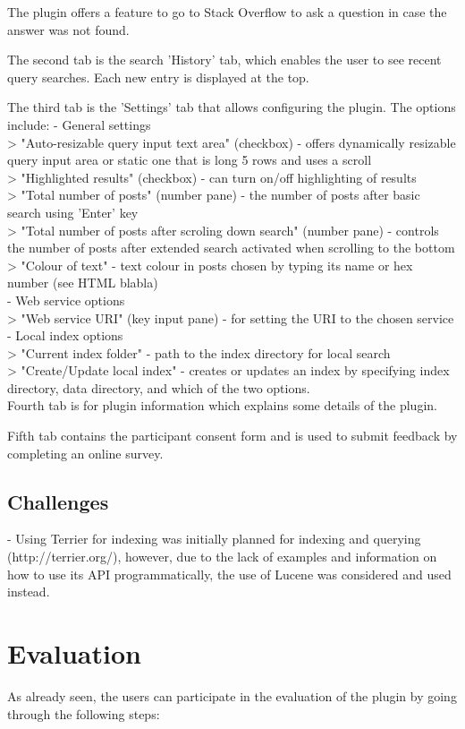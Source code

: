 \documentclass{l4proj}
\begin{document}
The plugin offers a feature to go to Stack Overflow to ask a question in case the answer was not found.

The second tab is the search 'History' tab, which enables the user to see recent query searches. Each new entry is displayed at the top.

The third tab is the 'Settings' tab that allows configuring the plugin. The options include:
- General settings\\
> "Auto-resizable query input text area" (checkbox) - offers dynamically resizable query input area or static one that is long 5 rows and uses a scroll\\
> "Highlighted results" (checkbox) - can turn on/off highlighting of results\\
> "Total number of posts" (number pane) - the number of posts after basic search using 'Enter' key \\
> "Total number of posts after scroling down search" (number pane) - controls the number of posts after extended search activated when scrolling to the bottom\\
> "Colour of text" - text colour in posts chosen by typing its name or hex number (see HTML blabla)\\
- Web service options\\
> "Web service URI" (key input pane) - for setting the URI to the chosen service\\
- Local index options\\
> "Current index folder" - path to the index directory for local search\\
> "Create/Update local index" - creates or updates an index by specifying index directory, data directory, and which of the two options.\\

Fourth tab is for plugin information which explains some details of the plugin.

Fifth tab contains the participant consent form and is used to submit feedback by completing an online survey.

\section{Challenges}
- Using Terrier for indexing was initially planned for indexing and querying (http://terrier.org/), however, due to the lack of examples and information on how to use its API programmatically, the use of Lucene was considered and used instead.

\chapter{Evaluation}
As already seen, the users can participate in the evaluation of the plugin by going through the following steps:
\end{document}

